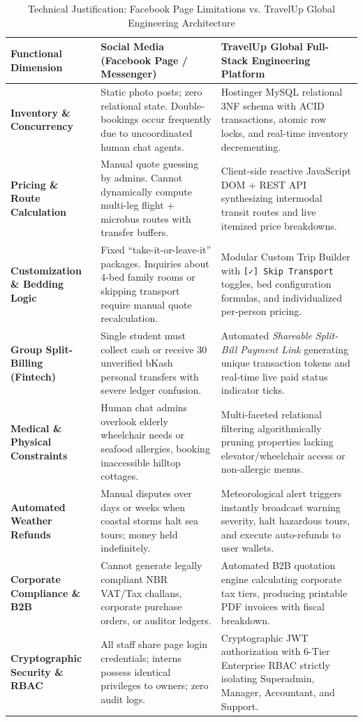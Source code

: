 \documentclass[11pt,a4paper]{article}
\begin{document}
\begin{table}[H]
\centering
\scriptsize
\renewcommand{\arraystretch}{1.2}
\begin{tabularx}{\textwidth}{p{2.6cm} p{5.0cm} X}
\toprule
\textbf{Functional Dimension} & \textbf{Social Media (Facebook Page / Messenger)} & \textbf{TravelUp Global Full-Stack Engineering Platform} \\
\midrule
\textbf{Inventory \& Concurrency} & Static photo posts; zero relational state. Double-bookings occur frequently due to uncoordinated human chat agents. & Hostinger MySQL relational 3NF schema with ACID transactions, atomic row locks, and real-time inventory decrementing. \\
\addlinespace
\textbf{Pricing \& Route Calculation} & Manual quote guessing by admins. Cannot dynamically compute multi-leg flight + microbus routes with transfer buffers. & Client-side reactive JavaScript DOM + REST API synthesizing intermodal transit routes and live itemized price breakdowns. \\
\addlinespace
\textbf{Customization \& Bedding Logic} & Fixed ``take-it-or-leave-it'' packages. Inquiries about 4-bed family rooms or skipping transport require manual quote recalculation. & Modular Custom Trip Builder with \texttt{[✓] Skip Transport} toggles, bed configuration formulas, and individualized per-person pricing. \\
\addlinespace
\textbf{Group Split-Billing (Fintech)} & Single student must collect cash or receive 30 unverified bKash personal transfers with severe ledger confusion. & Automated \textit{Shareable Split-Bill Payment Link} generating unique transaction tokens and real-time live paid status indicator ticks. \\
\addlinespace
\textbf{Medical \& Physical Constraints} & Human chat admins overlook elderly wheelchair needs or seafood allergies, booking inaccessible hilltop cottages. & Multi-faceted relational filtering algorithmically pruning properties lacking elevator/wheelchair access or non-allergic menus. \\
\addlinespace
\textbf{Automated Weather Refunds} & Manual disputes over days or weeks when coastal storms halt sea tours; money held indefinitely. & Meteorological alert triggers instantly broadcast warning severity, halt hazardous tours, and execute auto-refunds to user wallets. \\
\addlinespace
\textbf{Corporate Compliance \& B2B} & Cannot generate legally compliant NBR VAT/Tax challans, corporate purchase orders, or auditor ledgers. & Automated B2B quotation engine calculating corporate tax tiers, producing printable PDF invoices with fiscal breakdown. \\
\addlinespace
\textbf{Cryptographic Security \& RBAC} & All staff share page login credentials; interns possess identical privileges to owners; zero audit logs. & Cryptographic JWT authorization with 6-Tier Enterprise RBAC strictly isolating Superadmin, Manager, Accountant, and Support. \\
\bottomrule
\end{tabularx}
\caption{Technical Justification: Facebook Page Limitations vs. TravelUp Global Engineering Architecture}
\label{tab:fb_vs_web}
\end{table}
\end{document}
